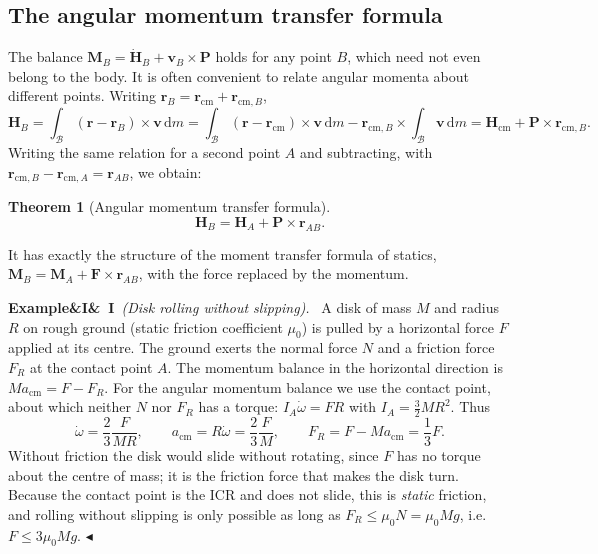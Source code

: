 \documentclass[11pt,a4paper,oneside]{report}
\numberwithin{equation}{chapter}
\newcommand{\vect}[1]{\bm{#1}}
\newcommand{\dd}{\,\mathrm{d}}
\newcommand{\cm}{\mathrm{cm}}
\theoremstyle{plain}
\newtheorem{theorem}{Theorem}[chapter]
\theoremstyle{definition}
\theoremstyle{remark}
\newenvironment{example}[2]{%
  \par\addvspace{\bigskipamount}\noindent
  \textbf{Example\ifx&#1&\else~#1\fi}\ \textit{(#2).}\ \ignorespaces}%
  {\hfill$\blacktriangleleft$\par\addvspace{\bigskipamount}}
\begin{document}
\subsection{The angular momentum transfer formula}
The balance $\vect M_B=\dot{\vect H}_B+\vect v_B\times\vect P$ holds for any point $B$, which need not even belong to the
body. It is often convenient to relate angular momenta about different points. Writing $\vect r_B=\vect r_\cm+\vect r_{\cm,B}$,
\[
  \vect H_B=\int_{\mathcal B}(\vect r-\vect r_B)\times\vect v\dd m
  =\int_{\mathcal B}(\vect r-\vect r_\cm)\times\vect v\dd m-\vect r_{\cm,B}\times\int_{\mathcal B}\vect v\dd m
  =\vect H_\cm+\vect P\times\vect r_{\cm,B}.
\]
Writing the same relation for a second point $A$ and subtracting, with $\vect r_{\cm,B}-\vect r_{\cm,A}=\vect r_{AB}$, we
obtain:
\begin{theorem}[Angular momentum transfer formula]
\begin{equation}
  \vect H_B=\vect H_A+\vect P\times\vect r_{AB}.
\end{equation}
\end{theorem}
It has exactly the structure of the moment transfer formula of statics, $\vect M_B=\vect M_A+\vect F\times\vect r_{AB}$,
with the force replaced by the momentum.

\begin{example}{I}{Disk rolling without slipping}
A disk of mass $M$ and radius $R$ on rough ground (static friction coefficient $\mu_0$) is pulled by a horizontal force $F$
applied at its centre. The ground exerts the normal force $N$ and a friction force $F_R$ at the contact point $A$. The
momentum balance in the horizontal direction is $Ma_\cm=F-F_R$. For the angular momentum balance we use the contact
point, about which neither $N$ nor $F_R$ has a torque: $I_A\dot\omega=FR$ with $I_A=\frac32MR^2$. Thus
\[
  \dot\omega=\frac23\frac F{MR},\qquad a_\cm=R\dot\omega=\frac23\frac FM,\qquad F_R=F-Ma_\cm=\frac13F .
\]
Without friction the disk would slide without rotating, since $F$ has no torque about the centre of mass; it is the
friction force that makes the disk turn. Because the contact point is the ICR and does not slide, this is \emph{static}
friction, and rolling without slipping is only possible as long as $F_R\le\mu_0N=\mu_0Mg$, i.e.\ $F\le3\mu_0Mg$.
\end{example}
\end{document}

